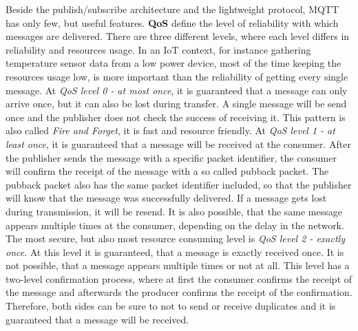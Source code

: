 Beside the publish/subscribe architecture and the lightweight protocol, \ac{MQTT} has only few, but useful features.
\textbf{\ac{QoS}} define the level of reliability with which messages are delivered.\autocite[cf.]{Bayer:MQTT}
There are three different levels, where each level differs in reliability and resources usage.\autocite[cf.]{Bayer:MQTT}
In an \ac{IoT} context, for instance gathering temperature sensor data from a low power device, most of the time keeping the resources usage low, is more important than the reliability of getting every single message.\newline
At \textit{\ac{QoS} level 0 - at most once}, it is guaranteed that a message can only arrive once, but it can also be lost during transfer.
A single message will be send once and the publisher does not check the success of receiving it.
This pattern is also called \textit{Fire and Forget}, it is fast and resource friendly.\autocite[cf.]{Bayer:MQTT}\newline
At \textit{\ac{QoS} level 1 - at least once}, it is guaranteed that a message will be received at the consumer.
After the publisher sends the message with a specific packet identifier, the consumer will confirm the receipt of the message with a so called pubback packet.
The pubback packet also has the same packet identifier included, so that the publisher will know that the message was successfully delivered.
If a message gets lost during transmission, it will be resend.
It is also possible, that the same message appears multiple times at the consumer, depending on the delay in the network.\newline
The most secure, but also most resource consuming level is \textit{\ac{QoS} level 2 - exactly once}.
At this level it is guaranteed, that a message is exactly received once.
It is not possible, that a message appears multiple times or not at all.
This level has a two-level confirmation process, where at first the consumer confirms the receipt of the message and afterwards the producer confirms the receipt of the confirmation.
Therefore, both sides can be sure to not to send or receive duplicates and it is guaranteed that a message will be received.

